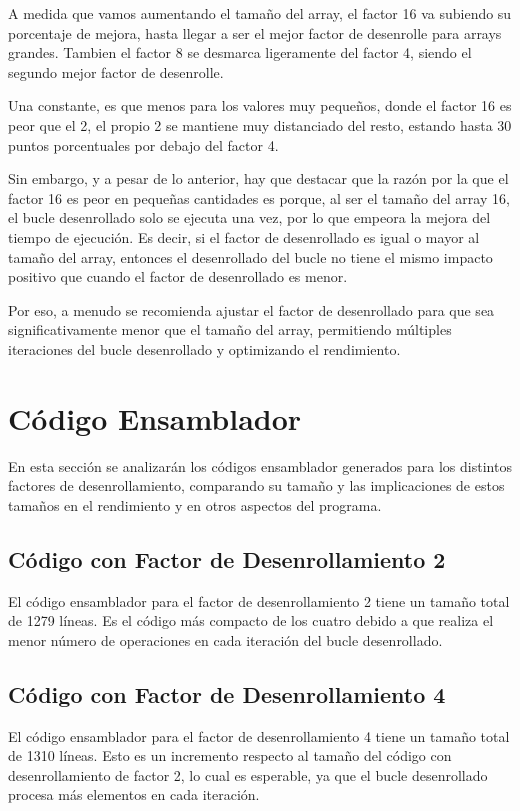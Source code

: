 \documentclass[a4paper,twocolumn]{article}
\begin{document}
A medida que vamos aumentando el tamaño del array, el factor 16 va subiendo su porcentaje de mejora, hasta llegar a ser el mejor factor de desenrolle para arrays grandes. Tambien el factor 8 se desmarca ligeramente del factor 4, siendo el segundo mejor factor de desenrolle.

Una constante, es que menos para los valores muy pequeños, donde el factor 16 es peor que el 2, el propio 2 se mantiene muy distanciado del resto, estando hasta 30 puntos porcentuales por debajo del factor 4.

Sin embargo, y a pesar de lo anterior, hay que destacar que la razón por la que el factor 16 es peor en pequeñas cantidades es porque, al ser el tamaño del array 16, el bucle desenrollado solo se ejecuta una vez, por lo que empeora la mejora del tiempo de ejecución. Es decir, si el factor de desenrollado es igual o mayor al tamaño del array, entonces el desenrollado del bucle no tiene el mismo impacto positivo que cuando el factor de desenrollado es menor.

Por eso, a menudo se recomienda ajustar el factor de desenrollado para que sea significativamente menor que el tamaño del array, permitiendo múltiples iteraciones del bucle desenrollado y optimizando el rendimiento.

\section{Código Ensamblador}

En esta sección se analizarán los códigos ensamblador generados para los distintos factores de desenrollamiento, comparando su tamaño y las implicaciones de estos tamaños en el rendimiento y en otros aspectos del programa.

\subsection{Código con Factor de Desenrollamiento 2}

El código ensamblador para el factor de desenrollamiento 2 tiene un tamaño total de 1279 líneas. Es el código más compacto de los cuatro debido a que realiza el menor número de operaciones en cada iteración del bucle desenrollado.

\subsection{Código con Factor de Desenrollamiento 4}

El código ensamblador para el factor de desenrollamiento 4 tiene un tamaño total de 1310 líneas. Esto es un incremento respecto al tamaño del código con desenrollamiento de factor 2, lo cual es esperable, ya que el bucle desenrollado procesa más elementos en cada iteración.
\end{document}
